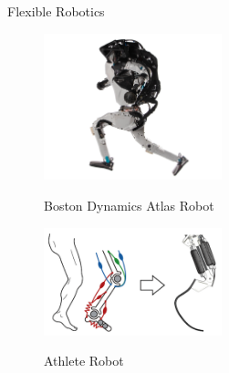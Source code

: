 \documentclass[final]{beamer}
\newlength{\onecolwid}
\begin{document}
\begin{frame}[t]
\begin{columns}[t]
\begin{column}{\onecolwid}
\begin{block}{Flexible Robotics}
%
\begin{figure}
    \captionsetup{justification=centering, labelformat=simple}
    \begin{center}
        \vspace{-0.25 in}
        \includegraphics[width=0.46\textwidth]{figures/atlas.png}
        \caption{\:Boston Dynamics Atlas Robot \cite{Atlas}}
        \label{fig:Boston Dynamics Atlas}
    \end{center}
    \captionsetup{justification=centering, labelformat=simple}
    \begin{center}
        \vspace{-0.25 in}
        \includegraphics[width=0.46\textwidth]{figures/flexible_leg.png}
        \caption{\:Athlete Robot \cite{Athlete}}
        \vspace{-0.35 in}
        \label{fig:Athlete Robot}
    \end{center}
\end{figure}
%


\end{block}
\end{column}
\end{columns}
\end{frame}
\end{document}
